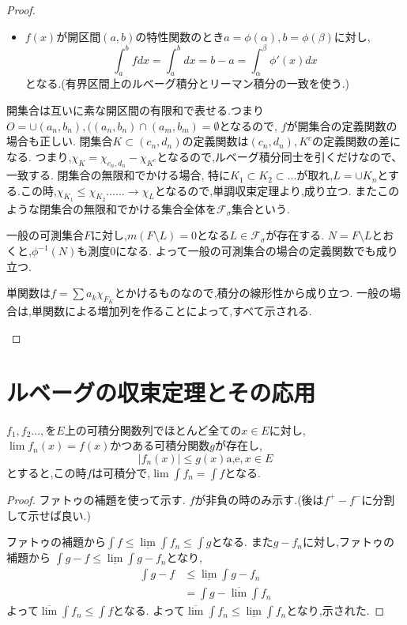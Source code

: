 \begin{proof}
\begin{enumerate}
\begin{itemize}
    \item $f(x)$が開区間$(a,b)$の特性関数のとき$a = \phi(\alpha), b = \phi(\beta)$に対し,
    \begin{equation*}
        \int_{a}^b fdx = \int_{a}^b dx = b-a = \int_{\alpha}^{\beta} \phi'(x) dx
    \end{equation*}
    となる.(有界区間上のルベーグ積分とリーマン積分の一致を使う.)
\end{itemize}
開集合は互いに素な開区間の有限和で表せる.つまり$O = \cup (a_n, b_n), ((a_n, b_n ) \cap  (a_m, b_m) = \emptyset$となるので,
$f$が開集合の定義関数の場合も正しい.
閉集合$K \subset (c_n, d_n)$の定義関数は$(c_n, d_n),K^c$の定義関数の差になる.
つまり,$\chi_K = \chi_{c_n, d_n} - \chi_{K^c}$となるので,ルベーグ積分同士を引くだけなので、一致する.
閉集合の無限和でかける場合,
特に$K_1 \subset K_2 \subset \ldots$が取れ,$L = \cup K_n$とする.この時,$\chi_{K_1} \le \chi_{K_2} \ldots ... \to \chi_L$となるので,単調収束定理より,成り立つ.
またこのような閉集合の無限和でかける集合全体を$\mathcal{F}_{\sigma}$集合という.

一般の可測集合$F$に対し,$m(F \setminus L) = 0$となる$L \in \mathcal{F}_{\sigma}$が存在する.
$N = F \setminus L$とおくと,$\phi^{-1}(N)$も測度0になる.
よって一般の可測集合の場合の定義関数でも成り立つ.

単関数は$f = \sum a_k \chi_{F_K}$とかけるものなので,積分の線形性から成り立つ.
一般の場合は,単関数による増加列を作ることによって,すべて示される.
\end{enumerate}
\end{proof}

\section{ルベーグの収束定理とその応用}

\begin{thm}[ルベーグの収束定理]
$f_1, f_2 \ldots, $を$E$上の可積分関数列でほとんど全ての$x \in E$に対し,$\lim f_n(x) = f(x)$かつある可積分関数$g$が存在し,
\begin{equation*}
    |f_n(x) |  \le g(x)  \mbox{a,e}, x \in E
\end{equation*}
とすると,この時$f$は可積分で,$\lim \int f_n = \int f$となる.
\end{thm}

\begin{proof}
ファトゥの補題を使って示す.
$f$が非負の時のみ示す.(後は$f^+ - f^-$に分割して示せば良い.)

ファトゥの補題から$\int  f \le  \underline{\lim} \int f_n  \le \int g$となる.
また$g - f_n$に対し,ファトゥの補題から
$\int g - f \le \underline{\lim} \int g - f_n$となり,
\begin{align*}
    \int g - f  & \le \underline{\lim} \int g - f_n \\ 
                & =  \int g - \overline{\lim}  \int f_n
\end{align*}
よって$\overline{\lim} \int f_n  \le \int f$となる.
よって$\overline{\lim} \int f_n  \le \underline{\lim} \int f_n$となり,示された.
\end{proof}


